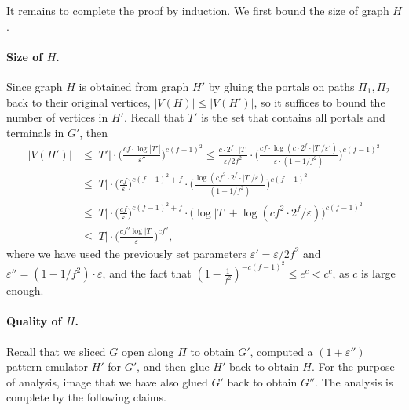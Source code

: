 \documentclass[11pt]{article}
\theoremstyle{definition}
\newcommand{\eps}{{\varepsilon}}
\begin{document}
It remains to complete the proof by induction. We first bound the size of graph $H$.
 
\paragraph{Size of $H$.} Since graph $H$ is obtained from graph $H'$ by gluing the portals on paths $\Pi_1,\Pi_2$ back to their original vertices, $|V(H)|\le |V(H')|$, so it suffices to bound the number of vertices in $H'$.
Recall that $T'$ is the set that contains all portals and terminals in $G'$, then
\[
\begin{split}
|V(H')| &
\le |T'|\cdot \bigg(\frac{cf\cdot \log |T'|}{\eps''}\bigg)^{c(f-1)^2}
\le \frac{c\cdot 2^f\cdot |T|}{\eps/2f^2}\cdot \bigg(\frac{cf\cdot \log (c\cdot 2^f\cdot |T|/\eps')}{\eps\cdot (1-1/f^2)}\bigg)^{c(f-1)^2}\\
&  \le |T|\cdot \bigg(\frac{cf}{\eps}\bigg)^{c(f-1)^2+f}\cdot \bigg(\frac{\log (cf^2\cdot 2^f\cdot |T|/\eps)}{(1-1/f^2)}\bigg)^{c(f-1)^2}\\
& \le |T|\cdot \bigg(\frac{cf}{\eps}\bigg)^{c(f-1)^2+f}\cdot \bigg(\log |T|+ \log (cf^2\cdot 2^f/\eps)\bigg)^{c(f-1)^2}\\
& \le |T|\cdot \bigg(\frac{cf^2 \log |T|}{\eps}\bigg)^{cf^2},
\end{split}
\]
where we have used the previously set parameters $\eps'=\eps/2f^2$ and $\eps''=(1-1/f^2)\cdot \eps$, and the fact that $(1-\frac{1}{f^2})^{-c(f-1)^2}\le e^{c}< c^{c}$, as $c$ is large enough.



\paragraph{Quality of $H$.}
Recall that we sliced $G$ open along $\Pi$ to obtain $G'$, computed a $(1+\eps'')$ pattern emulator $H'$ for $G'$, and then glue $H'$ back to obtain $H$.
For the purpose of analysis, image that we have also glued $G'$ back to obtain $G''$. The analysis is complete by the following claims.
\end{document}
